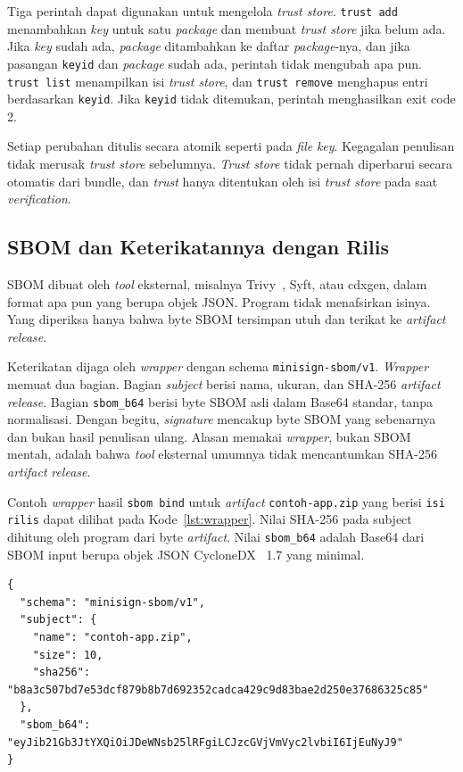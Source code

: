 Tiga perintah dapat digunakan untuk mengelola \textit{trust store}. \texttt{trust add} menambahkan
\textit{key} untuk satu \textit{package} dan membuat \textit{trust store} jika belum ada. Jika \textit{key} sudah ada,
\textit{package} ditambahkan ke daftar \textit{package}-nya, dan jika pasangan \texttt{keyid} dan \textit{package} sudah ada,
perintah tidak mengubah apa pun. \texttt{trust list} menampilkan isi \textit{trust store}, dan
\texttt{trust remove} menghapus entri berdasarkan \texttt{keyid}. Jika \texttt{keyid} tidak ditemukan,
perintah menghasilkan exit code 2.

Setiap perubahan ditulis secara atomik seperti pada \textit{file} \textit{key}. Kegagalan penulisan tidak
merusak \textit{trust store} sebelumnya. \textit{Trust store} tidak pernah diperbarui secara otomatis
dari bundle, dan \textit{trust} hanya ditentukan oleh isi \textit{trust store} pada saat \textit{verification}.

\subsection{SBOM dan Keterikatannya dengan Rilis}
SBOM dibuat oleh \textit{tool} eksternal, misalnya Trivy~\cite{trivy}, Syft, atau cdxgen, dalam format apa pun yang
berupa objek JSON. Program tidak menafsirkan isinya. Yang diperiksa hanya bahwa byte SBOM
tersimpan utuh dan terikat ke \textit{artifact} \textit{release}.

Keterikatan dijaga oleh \textit{wrapper} dengan schema \texttt{minisign-sbom/v1}. \textit{Wrapper} memuat
dua bagian. Bagian \textit{subject} berisi nama, ukuran, dan SHA-256 \textit{artifact} \textit{release}. Bagian
\texttt{sbom\_b64} berisi byte SBOM asli dalam Base64 standar, tanpa normalisasi. Dengan
begitu, \textit{signature} mencakup byte SBOM yang sebenarnya dan bukan hasil penulisan ulang.
Alasan memakai \textit{wrapper}, bukan SBOM mentah, adalah bahwa \textit{tool} eksternal umumnya tidak
mencantumkan SHA-256 \textit{artifact} \textit{release}.

Contoh \textit{wrapper} hasil \texttt{sbom bind} untuk \textit{artifact} \texttt{contoh-app.zip} yang berisi
\texttt{isi rilis} dapat dilihat pada Kode~\ref{lst:wrapper}. Nilai SHA-256 pada subject dihitung
oleh program dari byte \textit{artifact}. Nilai \texttt{sbom\_b64} adalah Base64 dari SBOM input
berupa objek JSON CycloneDX~\cite{cyclonedx} 1.7 yang minimal.

\begin{lstlisting}[basicstyle=\ttfamily\footnotesize,caption={Contoh \textit{wrapper} minisign-sbom/v1},label={lst:wrapper},numbers=none]
{
  "schema": "minisign-sbom/v1",
  "subject": {
    "name": "contoh-app.zip",
    "size": 10,
    "sha256": "b8a3c507bd7e53dcf879b8b7d692352cadca429c9d83bae2d250e37686325c85"
  },
  "sbom_b64": "eyJib21Gb3JtYXQiOiJDeWNsb25lRFgiLCJzcGVjVmVyc2lvbiI6IjEuNyJ9"
}
\end{lstlisting}

